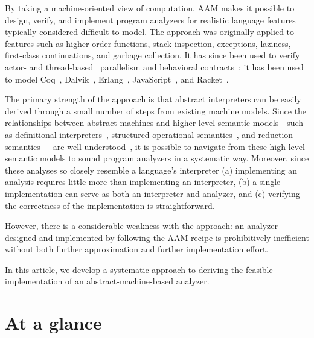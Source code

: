 \documentclass[preprint,onecolumn,9pt]{sigplanconf} %
\begin{document}
%

By taking a
machine-oriented view of computation, AAM makes it possible to design,
verify, and implement program analyzers for realistic language
features typically considered difficult to model.  The approach was
originally applied to features such as higher-order functions,
stack inspection, exceptions, laziness, first-class continuations, and
garbage collection.  It has since been used to verify actor-
\cite{local:DOsualdo:12A} and
thread-based~\cite{dvanhorn:Might2011Family} parallelism and
behavioral contracts~\cite{dvanhorn:TobinHochstadt2012Higherorder}; it
has been used to model Coq~\cite{local:harvard},
Dalvik~\cite{local:dalvik}, Erlang~\cite{local:DOsualdo:12B},
JavaScript~\cite{local:DBLP:journals/corr/abs-1109-4467}, and
Racket~\cite{dvanhorn:TobinHochstadt2012Higherorder}.

The primary strength of the approach is that abstract interpreters can
be easily derived through a small number of steps from existing
machine models.  Since the relationships between abstract machines and
higher-level semantic models---such as definitional
interpreters~\cite{dvanhorn:reynolds-hosc98}, structured operational
semantics~\cite{dvanhorn:Plotkin1981Structural}, and reduction
semantics~\cite{dvanhorn:Felleisen2009Semantics}---are well
understood~\cite{dvanhorn:Danvy:DSc}, it is possible to navigate from
these high-level semantic models to sound program analyzers in a
systematic way.  Moreover, since these analyses so closely resemble a
language's interpreter (a) implementing an analysis requires little
more than implementing an interpreter, (b) a single implementation can
serve as both an interpreter and analyzer, and (c) verifying the
correctness of the implementation is straightforward.

However, there is a considerable weakness with the approach: an
analyzer designed and implemented by following the AAM recipe is
prohibitively inefficient without both further approximation and
further implementation effort.

In this article, we develop a systematic approach to deriving the
feasible implementation of an abstract-machine-based analyzer.

\section{At a glance}
\end{document}
